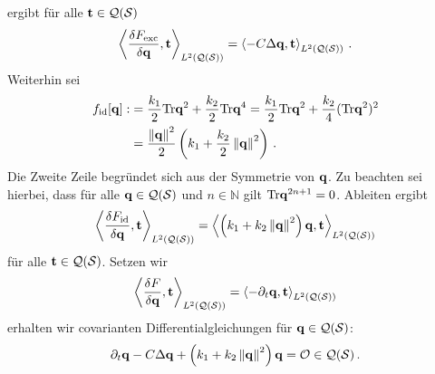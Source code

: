 \documentclass[a4paper,11pt]{scrartcl}
\newcommand{\qspace}{\mathcal{Q}(\surf)}
\newcommand{\Tr}{\text{Tr}}
\newcommand{\fid}{f_{\text{id}}}
\newcommand{\Fid}{F_{\text{id}}}
\newcommand{\Fexc}{F_{\text{exc}}}
\begin{document}
ergibt für alle \( \tb\in\qspace \)
\begin{align}
  \left\langle \frac{\delta\Fexc}{\delta\qb}, \tb \right\rangle_{L^{2}(\qspace)}
      = \left\langle -C\Delta\qb , \tb\right\rangle_{L^{2}(\qspace)} \formPeriod
\end{align}
Weiterhin sei
\begin{align}
  \fid[\qb] :&= \frac{k_{1}}{2}\Tr\qb^{2} + \frac{k_{2}}{2}\Tr\qb^{4}
              = \frac{k_{1}}{2}\Tr\qb^{2} + \frac{k_{2}}{4}(\Tr\qb^{2})^{2} \\
             &= \frac{\left\| \qb \right\|^{2}}{2}\left( k_{1} + \frac{k_{2}}{2}\left\| \qb \right\|^{2} \right) \formPeriod
\end{align}
Die Zweite Zeile begründet sich aus der Symmetrie von \( \mathbf{q} \).
Zu beachten sei hierbei, dass für alle \( \qb\in\qspace \) und \( n\in\mathbb{N} \) gilt  \( \Tr\qb^{2n+1} = 0\).
Ableiten ergibt
\begin{align}
  \left\langle \frac{\delta\Fid}{\delta\qb}, \tb \right\rangle_{L^{2}(\qspace)}
      = \left\langle \left( k_{1} + k_{2}\left\| \qb \right\|^{2} \right)\qb , \tb\right\rangle_{L^{2}(\qspace)}
\end{align}
für alle \( \tb\in\qspace \).
Setzen wir
\begin{align}
  \left\langle \frac{\delta F}{\delta\qb}, \tb \right\rangle_{L^{2}(\qspace)} 
      = \left\langle -\partial_{t}\qb, \tb \right\rangle_{L^{2}(\qspace)}
\end{align}
erhalten wir covarianten Differentialgleichungen für \( \qb\in\qspace \):
\begin{align}
  \partial_{t}\qb - C\Delta\qb + \left( k_{1} + k_{2}\left\| \qb \right\|^{2} \right)\qb = \mathcal{O} \in \qspace \formPeriod
\end{align}
\end{document}
